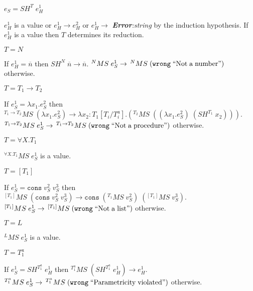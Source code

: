 \begin{case}
$e_{S}=SH^{T}\;e_{H}^{1}$

$e_{H}^{1}$ is a value or $e_{H}^{1}\rightarrow e_{H}^{2}$ or $e_{H}^{1}\rightarrow$ \emph{\textbf{Error}:\;string} by the induction hypothesis.  If $e_{H}^{1}$ is a value then $T$ determines its reduction.
\begin{subcase}
$T=N$

If $e_{H}^{1}=\overline{n}$ then $SH^{N}\;\overline{n}\rightarrow\overline{n}$.  $^{N}MS\;e_{S}^{1}\rightarrow\,^{N}MS\;(\mathtt{wrong}\;\mathrm{``Not\;a\;number"})$ otherwise.
\end{subcase}
\begin{subcase}
$T=T_{1}\rightarrow T_{2}$

If $e_{S}^{1}=\lambda x_{1}.e_{S}^{2}$ then $^{T_{1}\rightarrow T_{2}}MS\;(\lambda x_{1}.e_{S}^{2})\rightarrow\lambda x_{2}:T_{1}[T_{i}/T^{a}_{i}].(^{T_{2}}MS\;((\lambda x_{1}.e_{S}^{2})\;(SH^{T_{1}}\;x_{2})))$.  $^{T_{1}\rightarrow T_{2}}MS\;e_{S}^{1}\rightarrow\,^{T_{1}\rightarrow T_{2}}MS\;(\mathtt{wrong}\;\mathrm{``Not\;a\;procedure"})$ otherwise.
\end{subcase}
\begin{subcase}
$T=\forall X.T_{1}$

$^{\forall X.T_{1}}MS\;e_{S}^{1}$ is a value.
\end{subcase}
\begin{subcase}
$T=[T_{1}]$

If $e_{S}^{1}=\mathtt{cons}\;v_{S}^{2}\;v_{S}^{3}$ then $^{[T_{1}]}MS\;(\mathtt{cons}\;v_{S}^{2}\;v_{S}^{3})\rightarrow\mathtt{cons}\;(^{T_{1}}MS\;v_{S}^{2})\;(^{[T_{1}]}MS\;v_{S}^{3})$.  $^{[T_{1}]}MS\;e_{S}^{1}\rightarrow\,^{[T_{1}]}MS\;(\mathtt{wrong}\;\mathrm{``Not\;a\;list"})$ otherwise.
\end{subcase}
\begin{subcase}
$T=L$

$^{L}MS\;e_{S}^{1}$ is a value.
\end{subcase}
\begin{subcase}
$T=T_{1}^{a}$

If $e_{S}^{1}=SH^{T_{1}^{a}}\;e_{H}^{1}$ then $^{T_{1}^{a}}MS\;(SH^{T_{1}^{a}}\;e_{H}^{1})\rightarrow e_{H}^{1}$.  $^{T_{1}^{a}}MS\;e_{S}^{1}\rightarrow\,^{T_{1}^{a}}MS\;(\mathtt{wrong}\;\mathrm{``Parametricity\;violated"})$ otherwise.
\end{subcase}
\end{case}